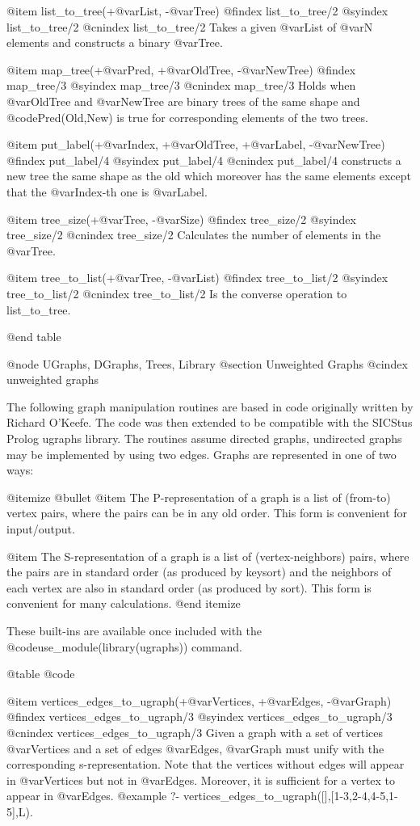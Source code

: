 {{{{{{{{{@item list_to_tree(+@var{List}, -@var{Tree})
@findex list_to_tree/2
@syindex list_to_tree/2
@cnindex list_to_tree/2
Takes a given @var{List} of @var{N} elements and constructs a binary
@var{Tree}.

@item map_tree(+@var{Pred}, +@var{OldTree}, -@var{NewTree})
@findex map_tree/3
@syindex map_tree/3
@cnindex map_tree/3
Holds when @var{OldTree} and @var{NewTree} are binary trees of the same shape
and @code{Pred(Old,New)} is true for corresponding elements of the two trees.

@item put_label(+@var{Index}, +@var{OldTree}, +@var{Label}, -@var{NewTree})
@findex put_label/4
@syindex put_label/4
@cnindex put_label/4
constructs a new tree the same shape as the old which moreover has the
same elements except that the @var{Index}-th one is @var{Label}.

@item tree_size(+@var{Tree}, -@var{Size})
@findex tree_size/2
@syindex tree_size/2
@cnindex tree_size/2
Calculates the number of elements in the @var{Tree}.

@item tree_to_list(+@var{Tree}, -@var{List})
@findex tree_to_list/2
@syindex tree_to_list/2
@cnindex tree_to_list/2
Is the converse operation to list_to_tree.

@end table

@node UGraphs, DGraphs, Trees, Library
@section Unweighted Graphs
@cindex unweighted graphs

The following graph manipulation routines are based in code originally
written by Richard O'Keefe. The code was then extended to be compatible
with the SICStus Prolog ugraphs library. The routines assume directed
graphs, undirected graphs may be implemented by using two edges. Graphs
are represented in one of two ways:

@itemize @bullet
@item The P-representation of a graph is a list of (from-to) vertex
pairs, where the pairs can be in any old order.  This form is
convenient for input/output.
 
@item The S-representation of a graph is a list of (vertex-neighbors)
pairs, where the pairs are in standard order (as produced by keysort)
and the neighbors of each vertex are also in standard order (as
produced by sort).  This form is convenient for many calculations.
@end itemize

These built-ins are available once included with the
@code{use_module(library(ugraphs))} command.

@table @code

@item vertices_edges_to_ugraph(+@var{Vertices}, +@var{Edges}, -@var{Graph})
@findex  vertices_edges_to_ugraph/3
@syindex vertices_edges_to_ugraph/3
@cnindex vertices_edges_to_ugraph/3
Given a graph with a set of vertices @var{Vertices} and a set of edges
@var{Edges}, @var{Graph} must unify with the corresponding
s-representation. Note that the vertices without edges will appear in
@var{Vertices} but not in @var{Edges}. Moreover, it is sufficient for a
vertex to appear in @var{Edges}.
@example
?- vertices_edges_to_ugraph([],[1-3,2-4,4-5,1-5],L).

}}}}}}}}}
